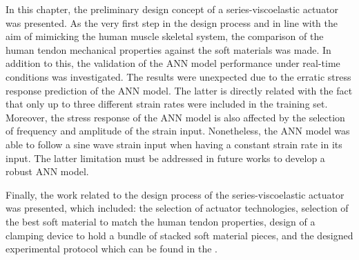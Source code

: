In this chapter, the preliminary design concept of a series-viscoelastic actuator was presented. As the very first step in the design process and in line with the aim of mimicking the human muscle skeletal system, the comparison of the human tendon mechanical properties against the soft materials was made. In addition to this, the validation of the ANN model performance under real-time conditions was investigated. The results were unexpected due to the erratic stress response prediction of the ANN model. The latter is directly related with the fact that only up to three different strain rates were included in the training set. Moreover, the stress response of the ANN model is also affected by the selection of frequency and amplitude of the strain input. Nonetheless, the ANN model was able to follow a sine wave strain input when having a constant strain rate in its input. The latter limitation must be addressed in future works to develop a robust ANN model.

Finally, the work related to the design process of the series-viscoelastic actuator was presented, which included: the selection of actuator technologies, selection of the best soft material to match the human tendon properties, design of a clamping device to hold a bundle of stacked soft material pieces, and the designed experimental protocol which can be found in the .